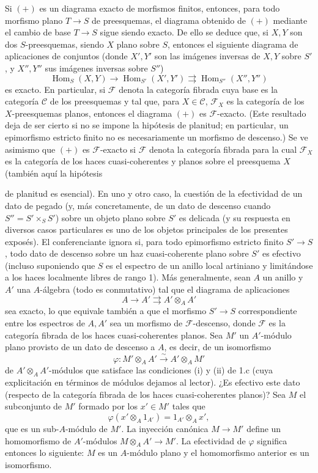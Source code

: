 Si $(+)$ es un diagrama exacto de morfismos finitos, entonces,
para todo morfismo plano $T\longrightarrow S$ de preesquemas, el diagrama
obtenido de $(+)$ mediante el cambio de base $T\longrightarrow S$ sigue siendo
exacto. De ello se deduce que, si $X,Y$ son dos $S$-preesquemas, siendo $X$
plano sobre $S$, entonces el siguiente diagrama de aplicaciones de conjuntos
(donde $X',Y'$ son las imágenes inversas de $X,Y$ sobre $S'$, y $X'',Y''$ sus
imágenes inversas sobre $S''$)
\[
  \operatorname{Hom}_S(X,Y)\longrightarrow
  \operatorname{Hom}_{S'}(X',Y')
  \rightrightarrows
  \operatorname{Hom}_{S''}(X'',Y'')
\]
es exacto. En particular, si $\mathcal F$ denota la categoría fibrada cuya base
es la categoría $\mathcal C$ de los preesquemas y tal que, para
$X\in\mathcal C$, $\mathcal F_X$ es la categoría de los $X$-preesquemas
planos, entonces el diagrama $(+)$ es $\mathcal F$-exacto. (Este resultado deja
de ser cierto si no se impone la hipótesis de planitud; en particular, un
epimorfismo estricto finito no es necesariamente un morfismo de descenso.) Se
ve asimismo que $(+)$ es $\mathcal F$-exacto si $\mathcal F$ denota la
categoría fibrada para la cual $\mathcal F_X$ es la categoría de los haces
cuasi-coherentes y planos sobre el preesquema $X$ (también aquí la hipótesis

de planitud es esencial). En uno y otro caso, la cuestión de la efectividad de
un dato de pegado (y, más concretamente, de un dato de descenso cuando
$S''=S'\times_SS'$) sobre un objeto plano sobre $S'$ es delicada (y su
respuesta en diversos casos particulares es uno de los objetos principales de
los presentes exposés). El conferenciante ignora si, para todo epimorfismo
estricto finito $S'\longrightarrow S$, todo dato de descenso sobre un haz
cuasi-coherente plano sobre $S'$ es efectivo (incluso suponiendo que $S$ es el
espectro de un anillo local artiniano y limitándose a los haces localmente
libres de rango 1). Más generalmente, sean $A$ un anillo y $A'$ una
$A$-álgebra (todo es conmutativo) tal que el diagrama de aplicaciones
\[
  A\longrightarrow A'\rightrightarrows A'\otimes_AA'
\]
sea exacto, lo que equivale también a que el morfismo
$S'\longrightarrow S$ correspondiente entre los espectros de $A,A'$ sea un
morfismo de $\mathcal F$-descenso, donde $\mathcal F$ es la categoría fibrada
de los haces cuasi-coherentes planos. Sea $M'$ un $A'$-módulo plano provisto de
un dato de descenso a $A$, es decir, de un isomorfismo
\[
  \varphi:M'\otimes_AA'\xrightarrow{\sim}A'\otimes_AM'
\]
de $A'\otimes_AA'$-módulos que satisface las condiciones (i) y (ii) de 1.c
(cuya explicitación en términos de módulos dejamos al lector). ¿Es efectivo
este dato (respecto de la categoría fibrada de los haces cuasi-coherentes
planos)? Sea $M$ el subconjunto de $M'$ formado por los $x'\in M'$ tales que
\[
  \varphi(x'\otimes_A1_{A'})=1_{A'}\otimes_Ax',
\]
que es un sub-$A$-módulo de $M'$. La inyección canónica
$M\longrightarrow M'$ define un homomorfismo de $A'$-módulos
$M\otimes_AA'\longrightarrow M'$. La efectividad de $\varphi$ significa
entonces lo siguiente: $M$ es un $A$-módulo plano y el homomorfismo anterior es
un isomorfismo.

